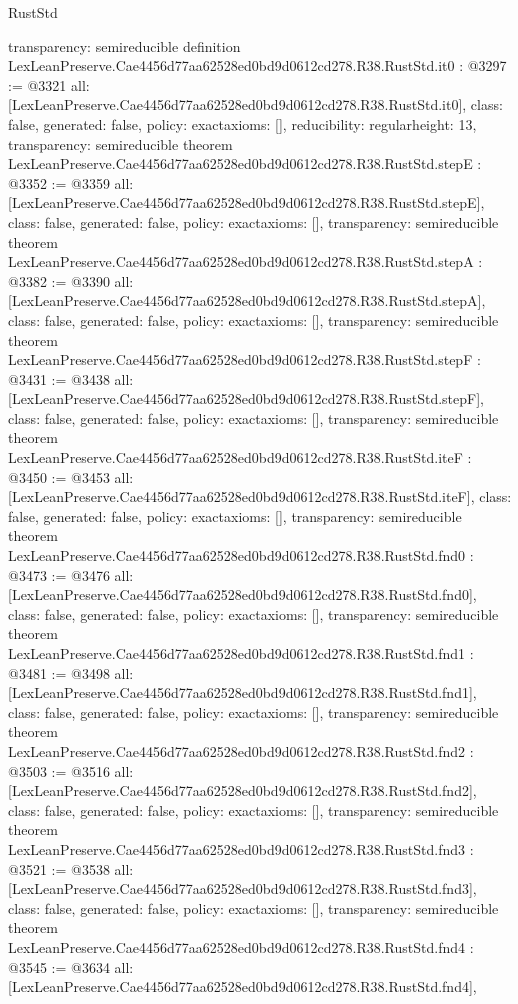 \begin{lexlean}{RustStd}
\begin{coremodule}
{  transparency: semireducible
}
definition LexLeanPreserve.Cae4456d77aa62528ed0bd9d0612cd278.R38.RustStd.it0 : @3297 := @3321 {
  all: [LexLeanPreserve.Cae4456d77aa62528ed0bd9d0612cd278.R38.RustStd.it0],
  class: false,
  generated: false,
  policy: exact{axioms: []},
  reducibility: regular{height: 13},
  transparency: semireducible
}
theorem LexLeanPreserve.Cae4456d77aa62528ed0bd9d0612cd278.R38.RustStd.stepE : @3352 := @3359 {
  all: [LexLeanPreserve.Cae4456d77aa62528ed0bd9d0612cd278.R38.RustStd.stepE],
  class: false,
  generated: false,
  policy: exact{axioms: []},
  transparency: semireducible
}
theorem LexLeanPreserve.Cae4456d77aa62528ed0bd9d0612cd278.R38.RustStd.stepA : @3382 := @3390 {
  all: [LexLeanPreserve.Cae4456d77aa62528ed0bd9d0612cd278.R38.RustStd.stepA],
  class: false,
  generated: false,
  policy: exact{axioms: []},
  transparency: semireducible
}
theorem LexLeanPreserve.Cae4456d77aa62528ed0bd9d0612cd278.R38.RustStd.stepF : @3431 := @3438 {
  all: [LexLeanPreserve.Cae4456d77aa62528ed0bd9d0612cd278.R38.RustStd.stepF],
  class: false,
  generated: false,
  policy: exact{axioms: []},
  transparency: semireducible
}
theorem LexLeanPreserve.Cae4456d77aa62528ed0bd9d0612cd278.R38.RustStd.iteF : @3450 := @3453 {
  all: [LexLeanPreserve.Cae4456d77aa62528ed0bd9d0612cd278.R38.RustStd.iteF],
  class: false,
  generated: false,
  policy: exact{axioms: []},
  transparency: semireducible
}
theorem LexLeanPreserve.Cae4456d77aa62528ed0bd9d0612cd278.R38.RustStd.fnd0 : @3473 := @3476 {
  all: [LexLeanPreserve.Cae4456d77aa62528ed0bd9d0612cd278.R38.RustStd.fnd0],
  class: false,
  generated: false,
  policy: exact{axioms: []},
  transparency: semireducible
}
theorem LexLeanPreserve.Cae4456d77aa62528ed0bd9d0612cd278.R38.RustStd.fnd1 : @3481 := @3498 {
  all: [LexLeanPreserve.Cae4456d77aa62528ed0bd9d0612cd278.R38.RustStd.fnd1],
  class: false,
  generated: false,
  policy: exact{axioms: []},
  transparency: semireducible
}
theorem LexLeanPreserve.Cae4456d77aa62528ed0bd9d0612cd278.R38.RustStd.fnd2 : @3503 := @3516 {
  all: [LexLeanPreserve.Cae4456d77aa62528ed0bd9d0612cd278.R38.RustStd.fnd2],
  class: false,
  generated: false,
  policy: exact{axioms: []},
  transparency: semireducible
}
theorem LexLeanPreserve.Cae4456d77aa62528ed0bd9d0612cd278.R38.RustStd.fnd3 : @3521 := @3538 {
  all: [LexLeanPreserve.Cae4456d77aa62528ed0bd9d0612cd278.R38.RustStd.fnd3],
  class: false,
  generated: false,
  policy: exact{axioms: []},
  transparency: semireducible
}
theorem LexLeanPreserve.Cae4456d77aa62528ed0bd9d0612cd278.R38.RustStd.fnd4 : @3545 := @3634 {
  all: [LexLeanPreserve.Cae4456d77aa62528ed0bd9d0612cd278.R38.RustStd.fnd4],
}
\end{coremodule}
\end{lexlean}
